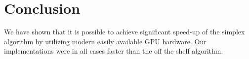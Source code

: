 \section{Conclusion}
We have shown that it is possible to achieve significant speed-up of the simplex algorithm by utilizing modern easily available GPU hardware. Our implementations were in all cases faster than the off the shelf algorithm. 